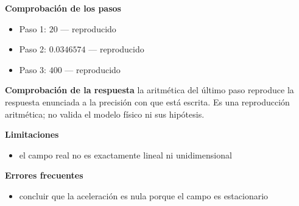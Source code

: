\documentclass[10pt,openany]{book}
\begin{document}
\begin{tcolorbox}[title={Problema resuelto}, studiumworked, breakable]
\noindent\textbf{Comprobación de los pasos}
\begin{itemize}
\item Paso 1: $20$ — reproducido
\item Paso 2: $0.0346574$ — reproducido
\item Paso 3: $400$ — reproducido
\end{itemize}

\noindent\textbf{Comprobación de la respuesta} la aritmética del último paso reproduce la respuesta enunciada a la precisión con que está escrita. Es una reproducción aritmética; no valida el modelo físico ni sus hipótesis.

\noindent\textbf{Limitaciones}
\begin{itemize}
\item el campo real no es exactamente lineal ni unidimensional
\end{itemize}

\noindent\textbf{Errores frecuentes}
\begin{itemize}
\item concluir que la aceleración es nula porque el campo es estacionario
\end{itemize}
\end{tcolorbox}
\end{document}
